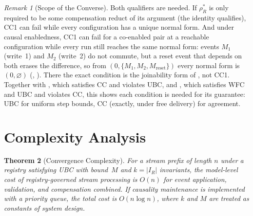 \documentclass[11pt,a4paper]{article}
\theoremstyle{plain}
\newtheorem{theorem}{Theorem}[section]
\theoremstyle{definition}
\theoremstyle{remark}
\newtheorem{remark}[theorem]{Remark}
\begin{document}
\begin{remark}[Scope of the Converse]
\label{rem:converse-scope}
Both qualifiers are needed.  If $\rho_R^*$ is only required to be some
compensation reduct of its argument (the identity qualifies), CC1 can fail
while every configuration has a unique normal form.  And under causal
enabledness, CC1 can fail for a co-enabled pair at a reachable configuration
while every run still reaches the same normal form: events $M_1$ (write~1)
and $M_2$ (write~2) do not commute, but a reset event that depends on both
erases the difference, so from $(0, \{M_1, M_2, M_{\mathrm{reset}}\})$ every
normal form is $(0, \varnothing)$ (,
).  There the exact condition is the
joinability form of , not CC1.  Together with
, which satisfies CC and violates UBC, and
, which satisfies WFC and UBC and violates CC, this
shows each condition is needed for its guarantee: UBC for uniform step
bounds, CC (exactly, under free delivery) for agreement.
\end{remark}

\section{Complexity Analysis}
\label{sec:complexity}

\begin{theorem}[Convergence Complexity]
\label{thm:complexity}
For a stream prefix of length $n$ under a registry satisfying UBC with
bound~$M$ and $k = |I_R|$ invariants, the model-level cost of
registry-governed stream processing is $O(n)$ for event application,
validation, and compensation combined.  If causality maintenance is
implemented with a priority queue, the total cost is $O(n \log n)$, where $k$
and $M$ are treated as constants of system design.
\end{theorem}
\end{document}
